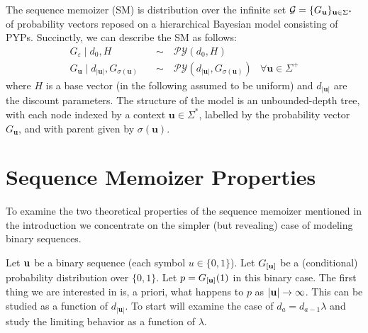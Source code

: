 \documentclass[11pt]{amsart}
\newcommand{\ubf}{\mathbf{u}}
\newcommand{\xbf}{\mathbf{x}}
\newcommand{\py}{\mathcal{PY}}
\newcommand{\suffix}{\sigma}
\begin{document}
The sequence memoizer (SM) \cite{wood2009sms} is distribution over the infinite set $\GG=\{G_\ubf\}_{\ubf\in\Sigma^*}$ of probability vectors reposed on a hierarchical Bayesian model consisting of PYPs.
%
Succinctly, we can describe the SM as follows:
\begin{subequations}
        \label{eqn:sm_prior}
        \begin{align}
            G_{\varepsilon} \mid d_0,H\quad &\sim \quad\py(d_0,H) \label{eq:m1} &\\
            G_{\ubf} \mid d_{|\ubf|},G_{\suffix(\ubf)} \quad
            &\sim \quad \py(d_{|\ubf|},G_{\suffix(\ubf)})  & \forall \ubf \in
            \Sigma^+ \label{eq:m2}%
        \end{align}
\end{subequations}
\noindent where $H$ is a base vector (in the following assumed to be
uniform) and $d_{|\ubf|}$ are the discount parameters.
The structure of the model is an unbounded-depth tree, with each node indexed by a context $\ubf\in\Sigma^*$, labelled by the probability vector $G_\ubf$, and with parent given by $\sigma(\ubf)$.

\section{Sequence Memoizer Properties}

To examine the two theoretical properties of the sequence memoizer mentioned in the introduction we concentrate on the simpler (but revealing) case of modeling binary sequences.

Let ${\bf u}$ be a binary sequence  (each symbol $u\in\{0,1\}$).  Let $ G_{[\bf u]}$ be a (conditional) probability distribution over $\{0,1\}$. Let $p = G_{[\bf u]}(1)$ in
this binary case.  The first thing we are interested in is, a priori, what happens to $p$ as 
$|{\bf u}| \rightarrow \infty$.  This can be studied as a function of $d_{|\ubf|}$.  To start will examine the case of
$d_a = d_{a-1} \lambda$ and study the
limiting behavior as a function of $\lambda$.
\end{document}
